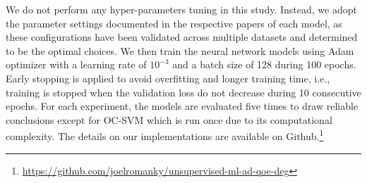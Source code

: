 We do not perform any hyper-parameters tuning in this study. Instead, we adopt the parameter settings documented in the respective papers of each model, as these configurations have been validated across multiple datasets and determined to be the optimal choices.
We then train the neural network models using Adam optimizer with a learning rate of $10^{-3}$ and a batch size of 128 during 100 epochs. Early stopping is applied to avoid overfitting and longer training time, i.e., training is stopped when the validation loss do not decrease during 10 consecutive epochs. For each experiment, the models are evaluated five times to draw reliable conclusions except for OC-SVM which is run once due to its computational complexity. The details on our implementations are available on Github.\footnote{\url{https://github.com/joelromanky/unsupervised-ml-ad-qoe-deg}} %

